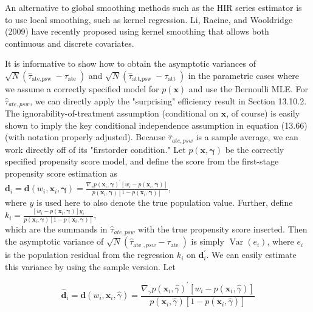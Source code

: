 \documentclass[10pt]{article}
\begin{document}
An alternative to global smoothing methods such as the HIR series estimator is to use local smoothing, such as kernel regression. Li, Racine, and Wooldridge (2009) have recently proposed using kernel smoothing that allows both continuous and discrete covariates.

It is informative to show how to obtain the asymptotic variances of $\sqrt{N}\left(\hat{\tau}_{\text {ate,psw }}-\tau_{\text {ate }}\right)$ and $\sqrt{N}\left(\hat{\tau}_{\text {att,psw }}-\tau_{\text {att }}\right)$ in the parametric cases where we assume a correctly specified model for $p(\mathbf{x})$ and use the Bernoulli MLE. For $\hat{\tau}_{a t e, p s w}$, we can directly apply the "surprising" efficiency result in Section 13.10.2. The ignorability-of-treatment assumption (conditional on $\mathbf{x}$, of course) is easily shown to imply the key conditional independence assumption in equation (13.66) (with notation properly adjusted). Because $\hat{\tau}_{a t e, p s w}$ is a sample average, we can work directly off of its "firstorder condition." Let $p(\mathbf{x}, \boldsymbol{\gamma})$ be the correctly specified propensity score model, and define the score from the first-stage propensity score estimation as\\
$\mathbf{d}_{i}=\mathbf{d}\left(w_{i}, \mathbf{x}_{i}, \boldsymbol{\gamma}\right)=\frac{\nabla_{\gamma} p\left(\mathbf{x}_{i}, \boldsymbol{\gamma}\right)^{\prime}\left[w_{i}-p\left(\mathbf{x}_{i}, \boldsymbol{\gamma}\right)\right]}{p\left(\mathbf{x}_{i}, \boldsymbol{\gamma}\right)\left[1-p\left(\mathbf{x}_{i}, \boldsymbol{\gamma}\right)\right]}$,\\
where $y$ is used here to also denote the true population value. Further, define\\
$k_{i}=\frac{\left[w_{i}-p\left(\mathbf{x}_{i}, \boldsymbol{\gamma}\right)\right] y_{i}}{p\left(\mathbf{x}_{i}, \boldsymbol{\gamma}\right)\left[1-p\left(\mathbf{x}_{i}, \boldsymbol{\gamma}\right)\right]}$,\\
which are the summands in $\hat{\tau}_{a t e, p s w}$ with the true propensity score inserted. Then the asymptotic variance of $\sqrt{N}\left(\hat{\tau}_{\text {ate }, p s w}-\tau_{\text {ate }}\right)$ is simply $\operatorname{Var}\left(e_{i}\right)$, where $e_{i}$ is the population residual from the regression $k_{i}$ on $\mathbf{d}_{i}^{\prime}$. We can easily estimate this variance by using the sample version. Let


\begin{equation*}
\hat{\mathbf{d}}_{i}=\mathbf{d}\left(w_{i}, \mathbf{x}_{i}, \hat{\gamma}\right)=\frac{\nabla_{\gamma} p\left(\mathbf{x}_{i}, \hat{\gamma}\right)^{\prime}\left[w_{i}-p\left(\mathbf{x}_{i}, \hat{\gamma}\right)\right]}{p\left(\mathbf{x}_{i}, \hat{\gamma}\right)\left[1-p\left(\mathbf{x}_{i}, \hat{\gamma}\right)\right]} \tag{21.42}
\end{equation*}
\end{document}
